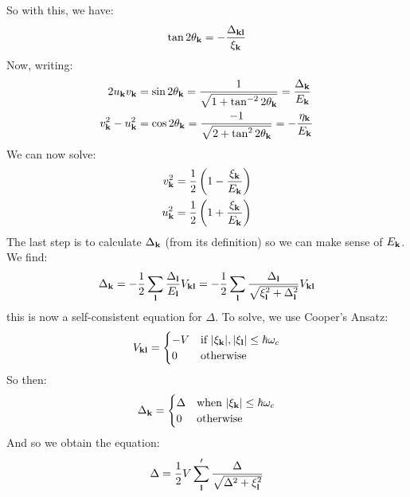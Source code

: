So with this, we have:
\begin{align*}
    \tan2\theta_{\mathbf{k}} = -\frac{\Delta_{\mathbf{k}\mathbf{l}}}{\xi_{\mathbf{k}}}
\end{align*}
Now, writing:
\begin{equation}
    \begin{split}
        2u_{\mathbf{k}}v_{\mathbf{k}} &= \sin2\theta_{\mathbf{k}} = \frac{1}{\sqrt{1 + \tan^{-2}2\theta_{\mathbf{k}}}} = \frac{\Delta_{\mathbf{k}}}{E_{\mathbf{k}}}
        \\ v_{\mathbf{k}}^2 - u_{\mathbf{k}}^2 &= \cos2\theta_{\mathbf{k}} = \frac{-1}{\sqrt{2 + \tan^22\theta_{\mathbf{k}}}} = -\frac{\eta_{\mathbf{k}}}{E_{\mathbf{k}}}
    \end{split}
\end{equation}
We can now solve:
\begin{equation}
    \begin{split}
        v_{\mathbf{k}}^2 &= \frac{1}{2}\left(1 - \frac{\xi_{\mathbf{k}}}{E_{\mathbf{k}}}\right)
        \\ u_{\mathbf{k}}^2 &= \frac{1}{2}\left(1 + \frac{\xi_{\mathbf{k}}}{E_{\mathbf{k}}}\right)
    \end{split}
\end{equation}
The last step is to calculate $\Delta_{\mathbf{k}}$ (from its definition) so we can make sense of $E_{\mathbf{k}}$. We find:
\begin{equation}
    \Delta_{\mathbf{k}} =-\frac{1}{2}\sum_{\mathbf{l}} \frac{\Delta_{\mathbf{l}}}{E_{\mathbf{l}}}V_{\mathbf{k}\mathbf{l}} = -\frac{1}{2}\sum_{\mathbf{l}}\frac{\Delta_{\mathbf{l}}}{\sqrt{\xi_{\mathbf{l}}^2 + \Delta_{\mathbf{l}}^2}}V_{\mathbf{k}\mathbf{l}}
\end{equation}
this is now a self-consistent equation for $\Delta$. To solve, we use Cooper's Ansatz:
\begin{equation}
    V_{\mathbf{k}\mathbf{l}} = \begin{cases}
        -V & \text{if $\lvert \xi_{\mathbf{k}} \rvert, \lvert \xi_{\mathbf{l}} \rvert \leq \hbar \omega_c$}
        \\ 0 & \text{otherwise}
    \end{cases}
\end{equation}
So then:
\begin{equation}
    \Delta_{\mathbf{k}} = \begin{cases}
        \Delta & \text{when $\lvert \xi_{\mathbf{k}} \rvert \leq \hbar\omega_c$}
        \\ 0 & \text{otherwise}
    \end{cases}
\end{equation}
And so we obtain the equation:
\begin{equation}
    \Delta = \frac{1}{2}V\sum_{\mathbf{l}}' \frac{\Delta}{\sqrt{\Delta^2 + \xi_{\mathbf{l}}^2}}
\end{equation}
